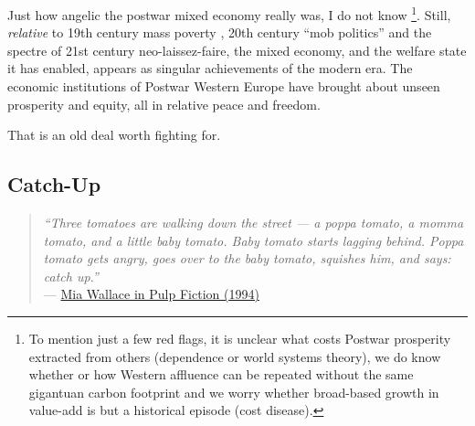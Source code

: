 \documentclass[11pt,a4paper,oneside,openright]{article}
\begin{document}
Just how angelic the postwar mixed economy really was, I do not know
\footnote{
	To mention just a few red flags, it is unclear what costs Postwar prosperity extracted from others (dependence or world systems theory), we do know whether or how Western affluence can be repeated without the same gigantuan carbon footprint and we worry whether broad-based growth in value-add is but a historical episode (cost disease).
}. 
Still, \emph{relative} to 19th century mass poverty \citep{MarxEngels-1848-aa}, 20th century ``mob politics'' \citep[158]{Crouch2004} and the spectre of 21st century neo-laissez-faire, the mixed economy, and the welfare state it has enabled, appears as singular achievements of the modern era. 
The economic institutions of Postwar Western Europe have brought about unseen prosperity and equity, all in relative peace and freedom. 

That is an old deal worth fighting for.

\subsection{Catch-Up}
\begin{quote}
	\emph{``Three tomatoes are walking down the street --- a poppa tomato, a momma tomato, and a little baby tomato. 
	Baby tomato starts lagging behind. 
	Poppa tomato gets angry, goes over to the baby tomato, squishes him, and says: catch up.''} \\
	--- \href{http://www.youtube.com/watch?v=5D_QKY0_Bxk}{Mia Wallace in Pulp Fiction (1994)}
\end{quote}



\end{document}
